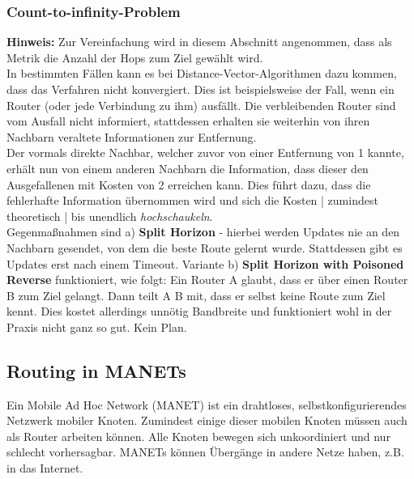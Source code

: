 \documentclass{article} %
\begin{document}
\subsubsection{Count-to-infinity-Problem}
\label{subsubsec:count-to-infinity}
\textbf{Hinweis:} Zur Vereinfachung wird in diesem Abschnitt angenommen, dass als Metrik die Anzahl der Hops zum Ziel gewählt wird.\\
In bestimmten Fällen kann es bei Distance-Vector-Algorithmen dazu kommen, dass das Verfahren nicht konvergiert.
Dies ist beispielsweise der Fall, wenn ein Router (oder jede Verbindung zu ihm) ausfällt.
Die verbleibenden Router sind vom Ausfall nicht informiert, stattdessen erhalten sie weiterhin von ihren Nachbarn veraltete Informationen zur Entfernung.\\
Der vormals direkte Nachbar, welcher zuvor von einer Entfernung von 1 kannte, erhält nun von einem anderen Nachbarn die Information, dass dieser den Ausgefallenen mit Kosten von 2 erreichen kann.
Dies führt dazu, dass die fehlerhafte Information übernommen wird und sich die Kosten | zumindest theoretisch | bis unendlich \emph{hochschaukeln}.\\
Gegenmaßnahmen sind a) \textbf{Split Horizon} - hierbei werden Updates nie an den Nachbarn gesendet, von dem die beste Route gelernt wurde.
Stattdessen gibt es Updates erst nach einem Timeout.
Variante b) \textbf{Split Horizon with Poisoned Reverse} funktioniert, wie folgt:
Ein Router A glaubt, dass er über einen Router B zum Ziel gelangt.
Dann teilt A B mit, dass er selbst keine Route zum Ziel kennt.
Dies kostet allerdings unnötig Bandbreite und funktioniert wohl in der Praxis nicht ganz so gut.
Kein Plan.
\subsection{Routing in MANETs}
Ein Mobile Ad Hoc Network (MANET) ist ein drahtloses, selbstkonfigurierendes Netzwerk mobiler Knoten.
Zumindest einige dieser mobilen Knoten müssen auch als Router arbeiten können.
Alle Knoten bewegen sich unkoordiniert und nur schlecht vorhersagbar.
MANETs können Übergänge in andere Netze haben, z.B. in das Internet.
\end{document}
